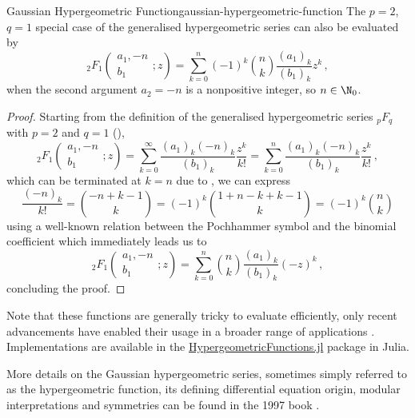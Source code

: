 \begin{lemma}{Gaussian Hypergeometric Function}{gaussian-hypergeometric-function}
  The $p=2$, $q=1$ special case of the generalised hypergeometric series can also be evaluated by
  $${}_2F_1\left(\begin{matrix}a_{1}, -n \\b_{1}\end{matrix}; z\right) = \sum_{k=0}^n (-1)^k \binom{n}{k} \frac{(a_1)_k}{(b_1)_k}z^k\,,$$
  when the second argument $a_2 = -n$ is a nonpositive integer, so $n \in \N_0$.
\end{lemma}
\begin{proof}
  Starting from the definition of the generalised hypergeometric series ${}_pF_q$ with $p=2$ and $q=1$ (),
  $${}_2F_1\left(\begin{matrix}a_{1}, -n \\b_{1}\end{matrix}; z\right) = \sum_{k=0}^{\infty} \frac{(a_1)_k (-n)_k}{(b_1)_k} \frac{z^k}{k!} = \sum_{k=0}^{n} \frac{(a_1)_k (-n)_k}{(b_1)_k} \frac{z^k}{k!}\,,$$
  which can be terminated at $k=n$ due to , we can express
  $$\frac{(-n)_k}{k!} = \binom{-n+k-1}{k} = (-1)^k \binom{1+n-k+k-1}{k} = (-1)^k \binom{n}{k}$$
  using a well-known relation between the Pochhammer symbol and the binomial coefficient \parencite{2001-pochhammer-binomial-relation,2018-nist} which immediately leads us to
  $${}_2F_1\left(\begin{matrix}a_{1}, -n \\b_{1}\end{matrix}; z\right) = \sum_{k=0}^n \binom{n}{k} \frac{(a_1)_k}{(b_1)_k}(-z)^k\,,$$
  concluding the proof.
\end{proof}

Note that these functions are generally tricky to evaluate efficiently, only recent advancements have enabled their usage in a broader range of applications \parencite{2008-hypergeometric-functions-jl-1,2017-hypergeometric-functions-jl-2,2023-hypergeometric-functions-jl-3}.
Implementations are available in the \href{https://github.com/JuliaMath/HypergeometricFunctions.jl}{HypergeometricFunctions.jl} package in Julia.

More details on the Gaussian hypergeometric series, sometimes simply referred to as the hypergeometric function, its defining differential equation origin, modular interpretations and symmetries can be found in the 1997 book  \parencite{1997-hypergeometric-functions-my-love}.
